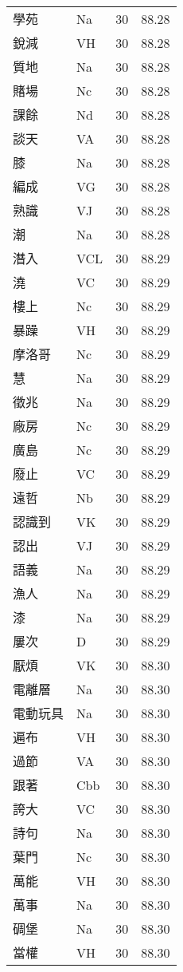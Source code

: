 \documentclass[twocolumn]{book}
\begin{document}
\begin{supertabular}{llrr}
學苑 & Na & 30 &  88.28\\
銳減 & VH & 30 &  88.28\\
質地 & Na & 30 &  88.28\\
賭場 & Nc & 30 &  88.28\\
課餘 & Nd & 30 &  88.28\\
談天 & VA & 30 &  88.28\\
膝 & Na & 30 &  88.28\\
編成 & VG & 30 &  88.28\\
熟識 & VJ & 30 &  88.28\\
潮 & Na & 30 &  88.28\\
潛入 & VCL & 30 &  88.29\\
澆 & VC & 30 &  88.29\\
樓上 & Nc & 30 &  88.29\\
暴躁 & VH & 30 &  88.29\\
摩洛哥 & Nc & 30 &  88.29\\
慧 & Na & 30 &  88.29\\
徵兆 & Na & 30 &  88.29\\
廠房 & Nc & 30 &  88.29\\
廣島 & Nc & 30 &  88.29\\
廢止 & VC & 30 &  88.29\\
遠哲 & Nb & 30 &  88.29\\
認識到 & VK & 30 &  88.29\\
認出 & VJ & 30 &  88.29\\
語義 & Na & 30 &  88.29\\
漁人 & Na & 30 &  88.29\\
漆 & Na & 30 &  88.29\\
屢次 & D & 30 &  88.29\\
厭煩 & VK & 30 &  88.30\\
電離層 & Na & 30 &  88.30\\
電動玩具 & Na & 30 &  88.30\\
遍布 & VH & 30 &  88.30\\
過節 & VA & 30 &  88.30\\
跟著 & Cbb & 30 &  88.30\\
誇大 & VC & 30 &  88.30\\
詩句 & Na & 30 &  88.30\\
葉門 & Nc & 30 &  88.30\\
萬能 & VH & 30 &  88.30\\
萬事 & Na & 30 &  88.30\\
碉堡 & Na & 30 &  88.30\\
當權 & VH & 30 &  88.30\\

\end{supertabular}
\end{document}
